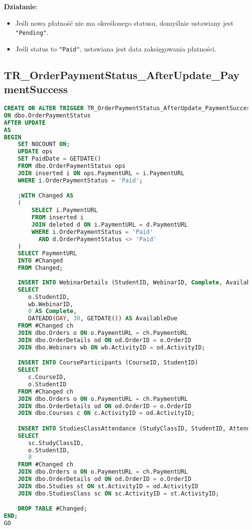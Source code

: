 \documentclass[12pt]{article}
\begin{document}
\noindent \textbf{Działanie}:  
\begin{itemize}
    \item Jeśli nowa płatność nie ma określonego statusu, domyślnie ustawiany jest \texttt{"Pending"}.
    \item Jeśli status to \texttt{"Paid"}, ustawiana jest data zaksięgowania płatności.
\end{itemize}


\newpage
\subsection{TR\_OrderPaymentStatus\_AfterUpdate\_PaymentSuccess}

\begin{lstlisting}[language=SQL]
CREATE OR ALTER TRIGGER TR_OrderPaymentStatus_AfterUpdate_PaymentSuccess
ON dbo.OrderPaymentStatus
AFTER UPDATE
AS
BEGIN
    SET NOCOUNT ON;
    UPDATE ops
    SET PaidDate = GETDATE()
    FROM dbo.OrderPaymentStatus ops
    JOIN inserted i ON ops.PaymentURL = i.PaymentURL
    WHERE i.OrderPaymentStatus = 'Paid';

    ;WITH Changed AS
    (
        SELECT i.PaymentURL
        FROM inserted i
        JOIN deleted d ON i.PaymentURL = d.PaymentURL
        WHERE i.OrderPaymentStatus = 'Paid'
          AND d.OrderPaymentStatus <> 'Paid'
    )
    SELECT PaymentURL
    INTO #Changed
    FROM Changed;
    
    INSERT INTO WebinarDetails (StudentID, WebinarID, Complete, AvailableDue)
    SELECT
       o.StudentID,
       wb.WebinarID,
       0 AS Complete,
       DATEADD(DAY, 30, GETDATE()) AS AvailableDue
    FROM #Changed ch
    JOIN dbo.Orders o ON o.PaymentURL = ch.PaymentURL
    JOIN dbo.OrderDetails od ON od.OrderID = o.OrderID
    JOIN dbo.Webinars wb ON wb.ActivityID = od.ActivityID;

    INSERT INTO CourseParticipants (CourseID, StudentID)
    SELECT
       c.CourseID,
       o.StudentID
    FROM #Changed ch
    JOIN dbo.Orders o ON o.PaymentURL = ch.PaymentURL
    JOIN dbo.OrderDetails od ON od.OrderID = o.OrderID
    JOIN dbo.Courses c ON c.ActivityID = od.ActivityID;

    INSERT INTO StudiesClassAttendance (StudyClassID, StudentID, Attendance)
    SELECT
       sc.StudyClassID,
       o.StudentID,
       0 
    FROM #Changed ch
    JOIN dbo.Orders o ON o.PaymentURL = ch.PaymentURL
    JOIN dbo.OrderDetails od ON od.OrderID = o.OrderID
    JOIN dbo.Studies st ON st.ActivityID = od.ActivityID
    JOIN dbo.StudiesClass sc ON sc.ActivityID = st.ActivityID;

    DROP TABLE #Changed;
END;
GO
\end{lstlisting}
\end{document}
